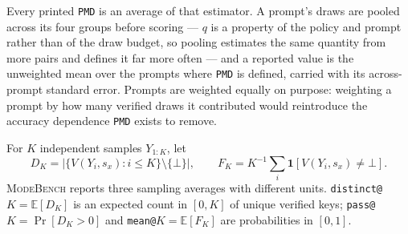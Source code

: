 \documentclass{article}
\newcommand{\1}{\mathbf 1}
\newcommand{\E}{\mathbb E}
\newcommand{\mb}{\textsc{ModeBench}}
\newcommand{\pmd}{\texttt{PMD}}
\theoremstyle{remark}
\theoremstyle{definition}
\theoremstyle{plain}
\begin{document}
Every printed \pmd{} is an average of that estimator. A prompt's draws are
pooled across its four groups before scoring --- $q$ is a property of the
policy and prompt rather than of the draw budget, so pooling estimates the
same quantity from more pairs and defines it far more often --- and a
reported value is the unweighted mean over the prompts where \pmd{} is
defined, carried with its across-prompt standard error. Prompts are weighted
equally on purpose: weighting a prompt by how many verified draws it
contributed would reintroduce the accuracy dependence \pmd{} exists to
remove.

For $K$ independent samples $Y_{1:K}$, let
\[
  D_K=\bigl|\{V(Y_i,s_x):i\le K\}\setminus\{\bot\}\bigr|,
  \qquad
  F_K=K^{-1}\sum_i \1[V(Y_i,s_x)\neq\bot].
\]
\mb{} reports three sampling averages with different units. \texttt{distinct@}$K
=\E[D_K]$ is an expected count in $[0,K]$ of unique verified keys;
\texttt{pass@}$K=\Pr[D_K>0]$ and \texttt{mean@}$K=\E[F_K]$ are probabilities
in $[0,1]$.
\end{document}
